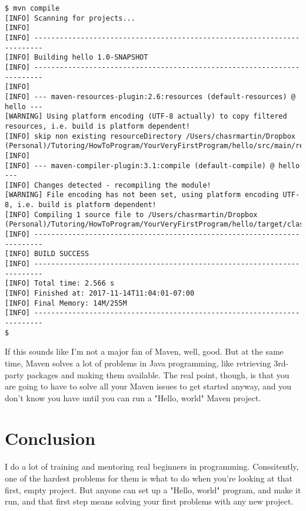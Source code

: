 \documentclass[11pt]{article}
\begin{document}
\begin{verbatim}
$ mvn compile
[INFO] Scanning for projects...
[INFO] 
[INFO] ------------------------------------------------------------------------
[INFO] Building hello 1.0-SNAPSHOT
[INFO] ------------------------------------------------------------------------
[INFO] 
[INFO] --- maven-resources-plugin:2.6:resources (default-resources) @ hello ---
[WARNING] Using platform encoding (UTF-8 actually) to copy filtered resources, i.e. build is platform dependent!
[INFO] skip non existing resourceDirectory /Users/chasrmartin/Dropbox (Personal)/Tutoring/HowToProgram/YourVeryFirstProgram/hello/src/main/resources
[INFO] 
[INFO] --- maven-compiler-plugin:3.1:compile (default-compile) @ hello ---
[INFO] Changes detected - recompiling the module!
[WARNING] File encoding has not been set, using platform encoding UTF-8, i.e. build is platform dependent!
[INFO] Compiling 1 source file to /Users/chasrmartin/Dropbox (Personal)/Tutoring/HowToProgram/YourVeryFirstProgram/hello/target/classes
[INFO] ------------------------------------------------------------------------
[INFO] BUILD SUCCESS
[INFO] ------------------------------------------------------------------------
[INFO] Total time: 2.566 s
[INFO] Finished at: 2017-11-14T11:04:01-07:00
[INFO] Final Memory: 14M/255M
[INFO] ------------------------------------------------------------------------
$ 

\end{verbatim}

If this sounds like I'm not a major fan of Maven, well, good. But at
the same time, Maven solves a lot of problems in Java programming,
like retrieving 3rd-party packages and making them available.  The
real point, though, is that you are going to have to solve all your
Maven issues to get started anyway, and you don't know you have until
you can run a "Hello, world" Maven project.

\section{Conclusion}
\label{sec:org2f9fe6b}

I do a lot of training and mentoring real beginners in
programming. Conssitently, one of the hardest problems for them is
what to do when you're looking at that first, empty project. But
anyone can set up a "Hello, world" program, and make it run, and that
first step means solving your first problems with any new project.
\end{document}
